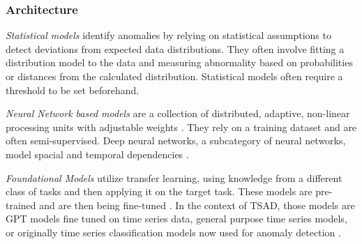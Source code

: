 \documentclass[12pt,oneside]{article}
\begin{document}
\subsubsection{Architecture} \textit{Statistical models} identify anomalies by relying on statistical assumptions to detect deviations from expected data distributions. They often involve fitting a distribution model to the data and measuring abnormality based on probabilities or distances from the calculated distribution. Statistical models often require a threshold to be set beforehand\parencites[p.~6-7]{liu2024elephant}[p.~1]{FOULADI2020102587}. \par \textit{Neural Network based models} are a collection of distributed, adaptive, non-linear processing units with adjustable weights \parencites[p.~427]{GURESEN2011426}. They rely on a training dataset and are often semi-supervised. Deep neural networks, a subcategory of neural networks, model spacial and temporal dependencies \parencites[p.~6-7]{liu2024elephant}[p.~6]{Zamanzadeh_Darban_2024}.\par \textit{Foundational Models} utilize transfer learning, using knowledge from a different class of tasks and then applying it on the target task. These models are pre-trained and are then being fine-tuned \parencites[p.~4]{bommasani2022opportunitiesrisksfoundationmodels}. In the context of TSAD, those models are GPT models fine tuned on time series data, general purpose time series models, or originally time series classification models now used for anomaly detection \parencites[p.~7]{liu2024elephant}.
\end{document}
